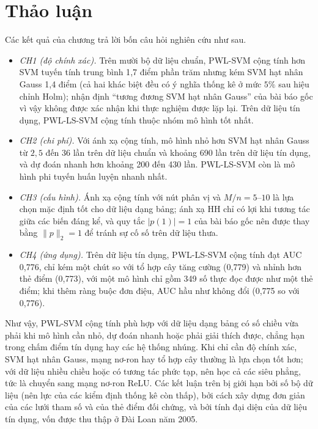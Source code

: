 \section{Thảo luận}\label{sec:discussion}

Các kết quả của chương trả lời bốn câu hỏi nghiên cứu như sau.
\begin{itemize}
\item \emph{CH1 (độ chính xác).} Trên mười bộ dữ liệu chuẩn, PWL-SVM cộng tính hơn SVM tuyến tính trung bình 1{,}7 điểm phần trăm nhưng kém SVM hạt nhân Gauss 1{,}4 điểm (cả hai khác biệt đều có ý nghĩa thống kê ở mức $5\%$ sau hiệu chỉnh Holm); nhận định “tương đương SVM hạt nhân Gauss” của bài báo gốc vì vậy không được xác nhận khi thực nghiệm được lặp lại. Trên dữ liệu tín dụng, PWL-LS-SVM cộng tính thuộc nhóm mô hình tốt nhất.
\item \emph{CH2 (chi phí).} Với ánh xạ cộng tính, mô hình nhỏ hơn SVM hạt nhân Gauss từ $2{,}5$ đến $36$ lần trên dữ liệu chuẩn và khoảng 690 lần trên dữ liệu tín dụng, và dự đoán nhanh hơn khoảng 200 đến 430 lần. PWL-LS-SVM còn là mô hình phi tuyến huấn luyện nhanh nhất.
\item \emph{CH3 (cấu hình).} Ánh xạ cộng tính với nút phân vị và $M/n=5$--$10$ là lựa chọn mặc định tốt cho dữ liệu dạng bảng; ánh xạ HH chỉ có lợi khi tương tác giữa các biến đáng kể, và quy tắc $|p(1)|=1$ của bài báo gốc nên được thay bằng $\|p\|_2=1$ để tránh sự cố số trên dữ liệu thưa.
\item \emph{CH4 (ứng dụng).} Trên dữ liệu tín dụng, PWL-LS-SVM cộng tính đạt AUC 0{,}776, chỉ kém một chút so với tổ hợp cây tăng cường (0{,}779) và nhỉnh hơn thẻ điểm (0{,}773), với một mô hình chỉ gồm 349 số thực đọc được như một thẻ điểm; khi thêm ràng buộc đơn điệu, AUC hầu như không đổi (0{,}775 so với 0{,}776).
\end{itemize}

Như vậy, PWL-SVM cộng tính phù hợp với dữ liệu dạng bảng có số chiều vừa phải khi mô hình cần nhỏ, dự đoán nhanh hoặc phải giải thích được, chẳng hạn trong chấm điểm tín dụng hay các hệ thống nhúng. Khi chỉ cần độ chính xác, SVM hạt nhân Gauss, mạng nơ-ron hay tổ hợp cây thường là lựa chọn tốt hơn; với dữ liệu nhiều chiều hoặc có tương tác phức tạp, nên học cả các siêu phẳng, tức là chuyển sang mạng nơ-ron ReLU. Các kết luận trên bị giới hạn bởi số bộ dữ liệu (nên lực của các kiểm định thống kê còn thấp), bởi cách xây dựng đơn giản của các lưới tham số và của thẻ điểm đối chứng, và bởi tính đại diện của dữ liệu tín dụng, vốn được thu thập ở Đài Loan năm 2005.

